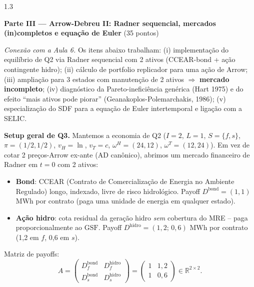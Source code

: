 \documentclass[11pt,addpoints]{exam}
\newcommand{\GSF}{\text{GSF}}
\begin{document}
\begin{spacing}{1.3}
\begin{questions}
\end{questions}

\newpage

\begin{center}\large\textbf{Parte III --- Arrow-Debreu II: Radner sequencial, mercados (in)completos e equação de Euler} \quad (35 pontos)\end{center}

\textit{Conexão com a Aula 6.} Os itens abaixo trabalham: (i) implementação do equilíbrio de Q2 via Radner sequencial com 2 ativos (CCEAR-bond + ação contingente hidro); (ii) cálculo de portfolio replicador para uma ação de Arrow; (iii) ampliação para 3 estados com manutenção de 2 ativos $\Rightarrow$ \textbf{mercado incompleto}; (iv) diagnóstico da Pareto-ineficiência genérica (Hart 1975) e do efeito ``mais ativos pode piorar'' (Geanakoplos-Polemarchakis, 1986); (v) especialização do SDF para a equação de Euler intertemporal e ligação com a SELIC.

\noindent\textbf{Setup geral de Q3.} Mantemos a economia de Q2 ($I = 2$, $L = 1$, $S = \{f, s\}$, $\pi = (1/2, 1/2)$, $v_H = \ln$, $v_T = c$, $\omega^H = (24, 12)$, $\omega^T = (12, 24)$). Em vez de cotar 2 preços-Arrow ex-ante (AD canônico), abrimos um mercado financeiro de Radner em $t = 0$ com 2 ativos:
\begin{itemize}[noitemsep,topsep=2pt]
\item \textbf{Bond}: CCEAR (Contrato de Comercialização de Energia no Ambiente Regulado) longo, indexado, livre de risco hidrológico. Payoff $D^{\text{bond}} = (1, 1)$ MWh por contrato (paga uma unidade de energia em qualquer estado).
\item \textbf{Ação hidro}: cota residual da geração hidro \emph{sem} cobertura do MRE -- paga proporcionalmente ao $\GSF$. Payoff $D^{\text{hidro}} = (1{,}2;\, 0{,}6)$ MWh por contrato (1{,}2 em $f$, 0{,}6 em $s$).
\end{itemize}
Matriz de payoffs:
\[
    A = \begin{pmatrix} D^{\text{bond}}_f & D^{\text{hidro}}_f \\ D^{\text{bond}}_s & D^{\text{hidro}}_s \end{pmatrix} = \begin{pmatrix} 1 & 1{,}2 \\ 1 & 0{,}6 \end{pmatrix} \in \mathbb{R}^{2 \times 2}.
\]


\end{spacing}
\end{document}
